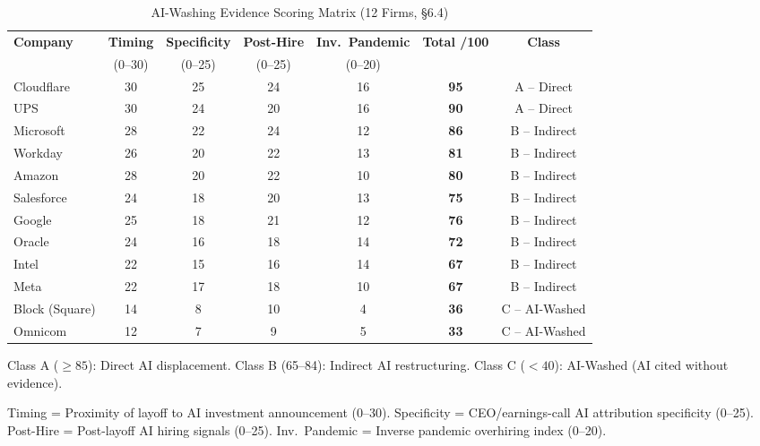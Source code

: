 \documentclass[12pt, a4paper]{article}
\begin{document}
\begin{table}[H]
\centering
\caption{AI-Washing Evidence Scoring Matrix (12 Firms, §6.4)}
\label{tab:scores}
\begin{threeparttable}
\small
\begin{tabular}{@{}lcccccc@{}}
\toprule
\textbf{Company} & \textbf{Timing} & \textbf{Specificity} & \textbf{Post-Hire} & \textbf{Inv.\ Pandemic} & \textbf{Total /100} & \textbf{Class} \\
 & (0--30) & (0--25) & (0--25) & (0--20) & & \\
\midrule
Cloudflare    & 30 & 25 & 24 & 16 & \textbf{95} & A -- Direct \\
UPS           & 30 & 24 & 20 & 16 & \textbf{90} & A -- Direct \\
Microsoft     & 28 & 22 & 24 & 12 & \textbf{86} & B -- Indirect \\
Workday       & 26 & 20 & 22 & 13 & \textbf{81} & B -- Indirect \\
Amazon        & 28 & 20 & 22 & 10 & \textbf{80} & B -- Indirect \\
Salesforce    & 24 & 18 & 20 & 13 & \textbf{75} & B -- Indirect \\
Google        & 25 & 18 & 21 & 12 & \textbf{76} & B -- Indirect \\
Oracle        & 24 & 16 & 18 & 14 & \textbf{72} & B -- Indirect \\
Intel         & 22 & 15 & 16 & 14 & \textbf{67} & B -- Indirect \\
Meta          & 22 & 17 & 18 & 10 & \textbf{67} & B -- Indirect \\
Block (Square)& 14 &  8 & 10 &  4 & \textbf{36} & C -- AI-Washed \\
Omnicom       & 12 &  7 &  9 &  5 & \textbf{33} & C -- AI-Washed \\
\bottomrule
\end{tabular}
\begin{tablenotes}
\small\item Class A ($\geq 85$): Direct AI displacement. Class B (65--84): Indirect AI restructuring.
Class C ($< 40$): AI-Washed (AI cited without evidence).
\item Timing = Proximity of layoff to AI investment announcement (0--30).
Specificity = CEO/earnings-call AI attribution specificity (0--25).
Post-Hire = Post-layoff AI hiring signals (0--25).
Inv.\ Pandemic = Inverse pandemic overhiring index (0--20).
\end{tablenotes}
\end{threeparttable}
\end{table}
\end{document}
